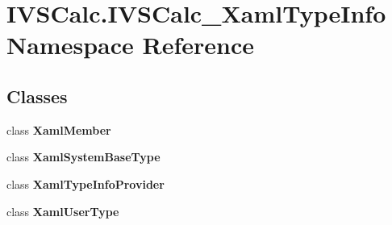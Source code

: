 \hypertarget{namespace_i_v_s_calc_1_1_i_v_s_calc___xaml_type_info}{}\section{I\+V\+S\+Calc.\+I\+V\+S\+Calc\+\_\+\+Xaml\+Type\+Info Namespace Reference}
\label{namespace_i_v_s_calc_1_1_i_v_s_calc___xaml_type_info}
\subsection*{Classes}
\begin{DoxyCompactItemize}
\item 
class {\bfseries Xaml\+Member}
\item 
class {\bfseries Xaml\+System\+Base\+Type}
\item 
class {\bfseries Xaml\+Type\+Info\+Provider}
\item 
class {\bfseries Xaml\+User\+Type}
\end{DoxyCompactItemize}
